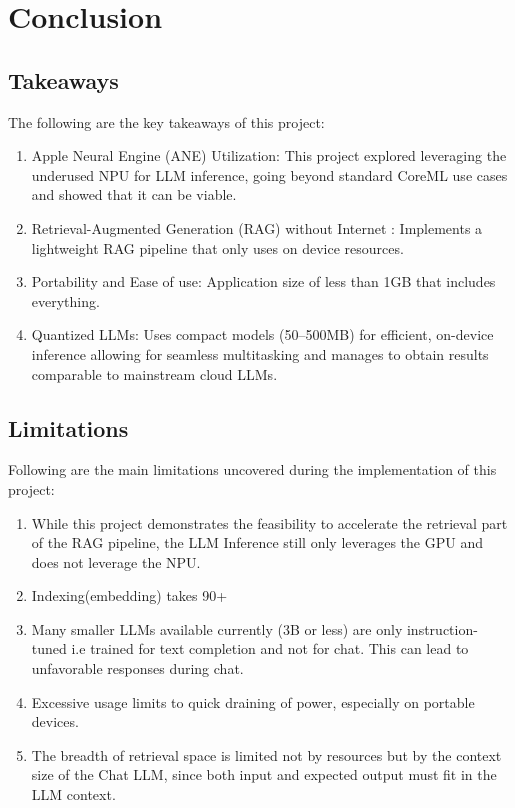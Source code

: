 
\chapter{Conclusion}
\label{ch:Conclusion}

\section{Takeaways}
\label{sec:Takeaways}
The following are the key takeaways of this project:
\begin{enumerate}[label=\alph*.]
\item Apple Neural Engine (ANE) Utilization: This project explored leveraging the underused NPU for LLM inference, going beyond standard CoreML use cases and showed that it can be viable.

\item Retrieval-Augmented Generation (RAG) without Internet : Implements a lightweight RAG pipeline that only uses on device resources.

\item Portability and Ease of use: Application size of less than 1GB that includes everything.

\item Quantized LLMs: Uses compact models (50–500MB) for efficient, on-device inference allowing for seamless multitasking and manages to obtain results comparable to mainstream cloud LLMs.
\end{enumerate}
\section{Limitations}
\label{sec:Limitations}
Following are the main limitations uncovered during the implementation of this project:
\begin{enumerate}[label=\alph*.]
\item While this project demonstrates the feasibility to accelerate the retrieval part of the RAG pipeline, the LLM Inference still only leverages the GPU and does not leverage the NPU.

\item Indexing(embedding) takes 90+%

\item Many smaller LLMs available currently (3B or less) are only instruction-tuned i.e trained for text completion and not for chat. This can lead to unfavorable responses during chat.

\item Excessive usage limits to quick draining of power, especially on portable devices.

\item The breadth of retrieval space is limited not by resources but by the context size of the Chat LLM, since both input and expected output must fit in the LLM context.

\end{enumerate}
